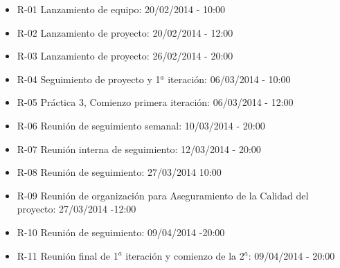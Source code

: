 \begin{itemize}
\item R-01 Lanzamiento de equipo: 	 20/02/2014 - 10:00
\item R-02 Lanzamiento de proyecto: 20/02/2014 - 12:00
\item R-03 Lanzamiento de proyecto: 26/02/2014 - 20:00
\item R-04 Seguimiento de proyecto y 1$^a$ iteración: 06/03/2014 - 10:00
\item R-05 Práctica 3, Comienzo primera iteración: 06/03/2014 - 12:00
\item R-06 Reunión de seguimiento semanal: 10/03/2014 - 20:00
\item R-07 Reunión interna de seguimiento: 12/03/2014 - 20:00 
\item R-08 Reunión de seguimiento: 27/03/2014 10:00
\item R-09 Reunión de organización para Aseguramiento de la Calidad del proyecto: 27/03/2014 -12:00
\item R-10 Reunión de seguimiento: 09/04/2014 -20:00
\item R-11 Reunión final de 1$^a$ iteración y comienzo de la 2$^a$: 09/04/2014 - 20:00
\end{itemize}
